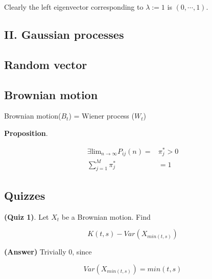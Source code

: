\documentclass[12pt]{article}
\theoremstyle{nonumberbreak}
\begin{document}
Clearly the left eigenvector corresponding to $\lambda:=1$ is $(0, \cdots, 1)$. 


\pagebreak
\begin{center}
\section*{II. Gaussian processes}
\end{center}
\setcounter{section}{2}
\setcounter{subsection}{0}

\subsection{Random vector}



\subsection{Brownian motion}

\begin{center}
Brownian motion($B_t$) = Wiener process ($W_t$)
\end{center}


\begin{theorem}
\textbf{Proposition}. 

$$
\begin{aligned}
\exists \mathrm{lim}_{n\to\infty} P_{ij}(n) =& \pi_j^\ast > 0 \\[8pt]
\sum_{j=1}^M \pi_j^\ast &= 1
\end{aligned}
$$

\end{theorem}





\subsection*{Quizzes}

\textbf{(Quiz 1)}. Let $X_t$ be a Brownian motion. Find

$$
K(t,s) - Var(X_{min(t,s)})
$$


\textbf{(Answer)} Trivially $0$, since

$$
Var(X_{min(t,s)}) = min(t,s)
$$
\end{document}
